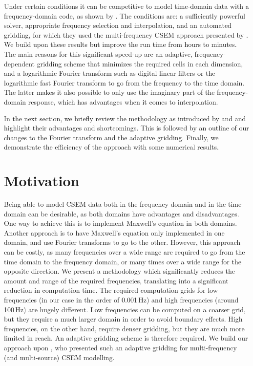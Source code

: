 \documentclass[
    manuscript,
    revised,
  ]{geophysics}
\newcommand{\simpeg}{\texttt{SimPEG}\xspace}
\begin{document}
Under certain conditions it can be competitive to model time-domain data with a
frequency-domain code, as shown by \cite{GEO.08.Mulder}. The conditions are: a
sufficiently powerful solver, appropriate frequency selection and
interpolation, and an automated gridding, for which they used the
multi-frequency CSEM approach presented by \cite{GEO.07.Plessix}. We build upon
these results but improve the run time from hours to minutes. The main reasons
for this significant speed-up are an adaptive, frequency-dependent gridding
scheme that minimizes the required cells in each dimension, and a logarithmic
Fourier transform such as digital linear filters \citep[DLF, ][]{GP.71.Ghosh}
or the logarithmic fast Fourier transform \citep[FFTLog, ][]{RAS.00.Hamilton}
to go from the frequency to the time domain. The latter makes it also possible
to only use the imaginary part of the frequency-domain response, which has
advantages when it comes to interpolation.

In the next section, we briefly review the methodology as introduced by
\cite{GEO.07.Plessix} and \cite{GEO.08.Mulder} and highlight their advantages
and shortcomings. This is followed by an outline of our changes to the Fourier
transform and the adaptive gridding. Finally, we demonstrate the efficiency of
the approach with some numerical results.

\section{Motivation}

Being able to model CSEM data both in the frequency-domain and in the
time-domain can be desirable, as both domains have advantages and
disadvantages. One way to achieve this is to implement Maxwell's equation in
both domains\old{, as it is done, for instance, in \simpeg (Cockett et al.,
2015)}. Another approach is to have Maxwell's equation only implemented in one
domain, and use Fourier transforms to go to the other. However, this approach
can be costly, as many frequencies over a wide range are required to go from
the time domain to the frequency domain, or many times over a wide range for
the opposite direction. We present a methodology which significantly reduces
the amount and range of the required frequencies, translating into a
significant reduction in computation time. The required computation grids for
low frequencies (in our case in the order of 0.001\,Hz) and high frequencies
(around 100\,Hz) are hugely different. Low frequencies can be computed on a
coarser grid, but they require a much larger domain in order to avoid boundary
effects. High frequencies, on the other hand, require denser gridding, but they
are much more limited in reach. An adaptive gridding scheme is therefore
required. We build our approach upon \cite{GEO.07.Plessix}, who presented such
an adaptive gridding for multi-frequency (and multi-source) CSEM modelling.
\end{document}
